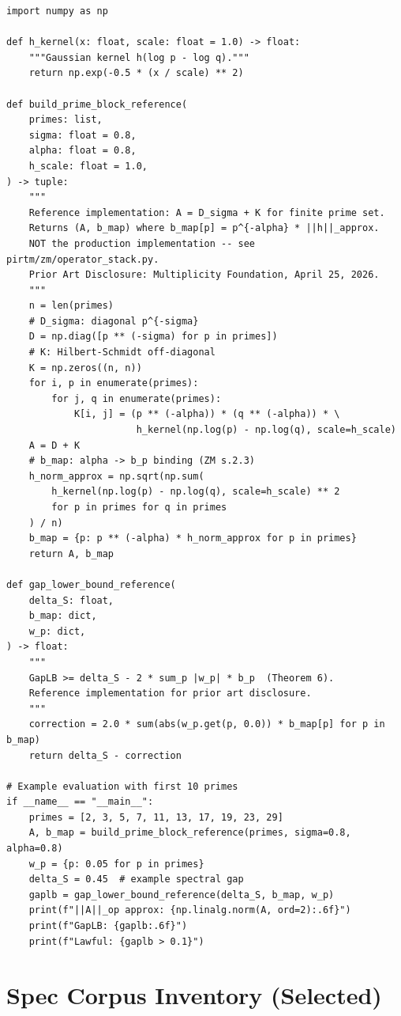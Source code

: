 \documentclass[12pt,letterpaper]{article}
\theoremstyle{definition}
\theoremstyle{remark}
\begin{document}
\begin{lstlisting}[caption={Finite prime truncation reference (translatable from ZM s.6.4)},
                   label={lst:sage}]
import numpy as np

def h_kernel(x: float, scale: float = 1.0) -> float:
    """Gaussian kernel h(log p - log q)."""
    return np.exp(-0.5 * (x / scale) ** 2)

def build_prime_block_reference(
    primes: list,
    sigma: float = 0.8,
    alpha: float = 0.8,
    h_scale: float = 1.0,
) -> tuple:
    """
    Reference implementation: A = D_sigma + K for finite prime set.
    Returns (A, b_map) where b_map[p] = p^{-alpha} * ||h||_approx.
    NOT the production implementation -- see pirtm/zm/operator_stack.py.
    Prior Art Disclosure: Multiplicity Foundation, April 25, 2026.
    """
    n = len(primes)
    # D_sigma: diagonal p^{-sigma}
    D = np.diag([p ** (-sigma) for p in primes])
    # K: Hilbert-Schmidt off-diagonal
    K = np.zeros((n, n))
    for i, p in enumerate(primes):
        for j, q in enumerate(primes):
            K[i, j] = (p ** (-alpha)) * (q ** (-alpha)) * \
                       h_kernel(np.log(p) - np.log(q), scale=h_scale)
    A = D + K
    # b_map: alpha -> b_p binding (ZM s.2.3)
    h_norm_approx = np.sqrt(np.sum(
        h_kernel(np.log(p) - np.log(q), scale=h_scale) ** 2
        for p in primes for q in primes
    ) / n)
    b_map = {p: p ** (-alpha) * h_norm_approx for p in primes}
    return A, b_map

def gap_lower_bound_reference(
    delta_S: float,
    b_map: dict,
    w_p: dict,
) -> float:
    """
    GapLB >= delta_S - 2 * sum_p |w_p| * b_p  (Theorem 6).
    Reference implementation for prior art disclosure.
    """
    correction = 2.0 * sum(abs(w_p.get(p, 0.0)) * b_map[p] for p in b_map)
    return delta_S - correction

# Example evaluation with first 10 primes
if __name__ == "__main__":
    primes = [2, 3, 5, 7, 11, 13, 17, 19, 23, 29]
    A, b_map = build_prime_block_reference(primes, sigma=0.8, alpha=0.8)
    w_p = {p: 0.05 for p in primes}
    delta_S = 0.45  # example spectral gap
    gaplb = gap_lower_bound_reference(delta_S, b_map, w_p)
    print(f"||A||_op approx: {np.linalg.norm(A, ord=2):.6f}")
    print(f"GapLB: {gaplb:.6f}")
    print(f"Lawful: {gaplb > 0.1}")
\end{lstlisting}

\section{Spec Corpus Inventory (Selected)}
\label{app:specs}
\end{document}
